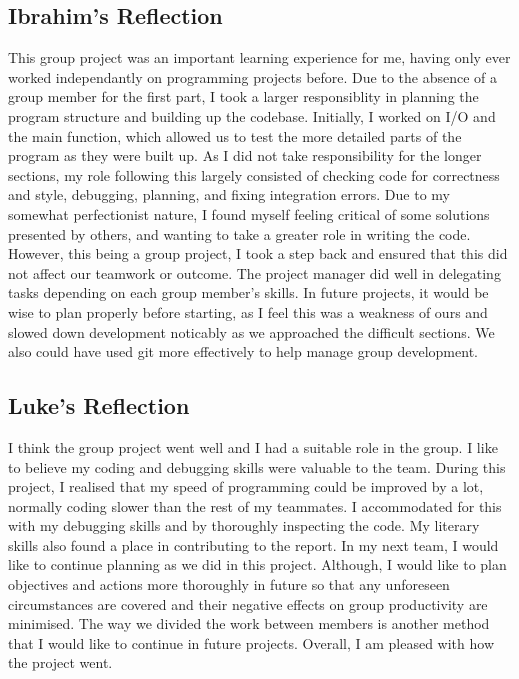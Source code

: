 \documentclass[11pt]{article}
\begin{document}
\subsection{Ibrahim's Reflection}
This group project was an important learning experience for me, having only ever worked independantly on programming projects before. Due to the absence of a group member for the first part, I took a larger responsiblity in planning the program structure and building up the codebase. Initially, I worked on I/O and the main function, which allowed us to test the more detailed parts of the program as they were built up. As I did not take responsibility for the longer sections, my role following this largely consisted of checking code for correctness and style, debugging, planning, and fixing integration errors. Due to my somewhat perfectionist nature, I found myself feeling critical of some solutions presented by others, and wanting to take a greater role in writing the code. However, this being a group project, I took a step back and ensured that this did not affect our teamwork or outcome. The project manager did well in delegating tasks depending on each group member's skills. In future projects, it would be wise to plan properly before starting, as I feel this was a weakness of ours and slowed down development noticably as we approached the difficult sections. We also could have used git more effectively to help manage group development.

\subsection{Luke's Reflection}
I think the group project went well and I had a suitable role in the group.
I like to believe my coding and debugging skills were valuable to the team.
During this project, I realised that my speed of programming could be improved by a lot,
normally coding slower than the rest of my teammates. I accommodated for this
with my debugging skills and by thoroughly inspecting the code.
My literary skills also found a place in contributing to the report.
In my next team, I would like to continue planning as we did in this project.
Although, I would like to plan objectives and actions more thoroughly in future so that
any unforeseen circumstances are covered and their negative effects on group productivity are minimised. The way we divided the work between members is another
method that I would like to continue in future projects.
Overall, I am pleased with how the project went.
\end{document}
